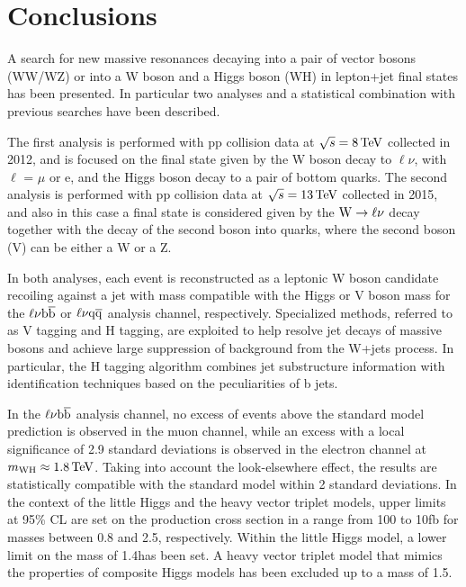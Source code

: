 \chapter{Conclusions}
\label{ch:summary1}

A search for new massive resonances decaying into a pair of vector bosons (WW/WZ) or into a W boson and a Higgs boson (WH)
in lepton+jet final states has been presented. In particular two analyses and a statistical combination with previous searches have been described.

The first analysis is performed with pp collision data at $\sqrt{s} = 8\,\text{Te\hspace{-.08em}V}$ collected in 2012, and is focused on the final state given by the W boson decay to $\ell\nu$, with $\ell$ = $\mu$ or e,
and the Higgs boson decay to a pair of bottom quarks.
The second analysis is performed with pp collision data at $\sqrt{s} = 13\,\text{Te\hspace{-.08em}V}$ collected in 2015, and also in this case a final state is considered given by the $\mathrm{W}\to\ell\nu$ decay together with the decay of the second boson into quarks, where the second boson (V) can be either a W or a Z. 

In both analyses, each event is reconstructed as a leptonic W boson candidate recoiling against a jet with mass compatible with the Higgs or V boson mass for the $\ell\nu{\mathrm{b}\overline{\mathrm{b}}}$ or $\ell\nu\mathrm{q}\overline{\mathrm{q}}$ analysis channel, respectively.
Specialized methods, referred to as V tagging and H tagging, are exploited to help resolve jet decays of massive bosons and achieve large suppression of background from the W+jets process.
In particular, the H tagging algorithm combines jet substructure information with identification techniques based on the peculiarities of b jets.

In the $\ell\nu{\mathrm{b}\overline{\mathrm{b}}}$ analysis channel, no excess of events above the standard model prediction is observed in the muon channel,
while an excess with a local significance of 2.9 standard deviations is observed in the electron channel at $m_{\rm WH} \approx 1.8\,\text{Te\hspace{-.08em}V}$.
Taking into account the look-elsewhere effect, the results are statistically compatible with the standard model within 2 standard deviations.
In the context of the little Higgs and the heavy vector triplet models, upper limits at 95\% CL are set on the \Wpr production cross section
in a range from 100 to 10\unit{fb} for masses between 0.8 and 2.5\TeV, respectively.
Within the little Higgs model, a lower limit on the \Wpr mass of 1.4\TeV has been set.
A heavy vector triplet model that mimics the properties of composite Higgs models has been excluded up to a \Wpr mass of 1.5\TeV.

